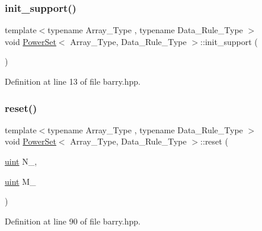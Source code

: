 \subsubsection{\texorpdfstring{init\+\_\+support()}{init\_support()}}
{\footnotesize\ttfamily template$<$typename Array\+\_\+\+Type , typename Data\+\_\+\+Rule\+\_\+\+Type $>$ \\
void \hyperlink{classbarry_1_1_power_set}{Power\+Set}$<$ Array\+\_\+\+Type, Data\+\_\+\+Rule\+\_\+\+Type $>$\+::init\+\_\+support (\begin{DoxyParamCaption}{ }\end{DoxyParamCaption})\hspace{0.3cm}{\ttfamily [inline]}}



Definition at line 13 of file barry.\+hpp.

\mbox{\label{classbarry_1_1_power_set_aba11dd8802cd2eb529c7c30b55994248}} 
\subsubsection{\texorpdfstring{reset()}{reset()}}
{\footnotesize\ttfamily template$<$typename Array\+\_\+\+Type , typename Data\+\_\+\+Rule\+\_\+\+Type $>$ \\
void \hyperlink{classbarry_1_1_power_set}{Power\+Set}$<$ Array\+\_\+\+Type, Data\+\_\+\+Rule\+\_\+\+Type $>$\+::reset (\begin{DoxyParamCaption}\item[{\hyperlink{namespacebarry_a11dfc53ddb4672278319aa04f1e09a6c}{uint}}]{N\+\_\+,  }\item[{\hyperlink{namespacebarry_a11dfc53ddb4672278319aa04f1e09a6c}{uint}}]{M\+\_\+ }\end{DoxyParamCaption})\hspace{0.3cm}{\ttfamily [inline]}}



Definition at line 90 of file barry.\+hpp.

\mbox{\label{classbarry_1_1_power_set_af8b336d7b958c44bb69cd24d7a462ed8}} 
